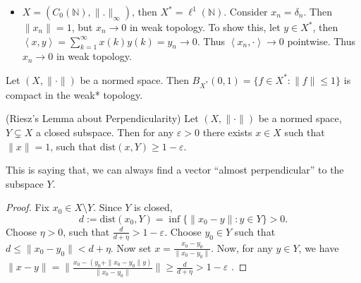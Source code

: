 \begin{example}
	\begin{itemize}
		\item $X = (C_0(\mathbb{N}), \|.\|_\infty )$, then $X^* = \ell^1(\mathbb{N})$. 
			Consider $x_n = \delta_n$. Then $\|x_n\| = 1$, but $x_n \to 0$ in weak topology. To show this, let $y \in X^*$, then $\left\langle x, y \right\rangle = \sum_{k = 1}^\infty x(k) y(k) = y_n \to 0$. Thus $\left\langle x_n, \cdot  \right\rangle \to 0$ pointwise. Thus $x_n \to  0$ in weak topology.
	\end{itemize}
\end{example}

\begin{theorem}
	\label{thm:BanachAlaogluThm}
	Let $(X, \|\cdot \|)$ be a normed space. Then $B_{X^*}(0,1) = \{f \in X^*: \|f\|\le 1\} $ is compact in the weak* topology.
\end{theorem} 

\begin{lemma}(Riesz's Lemma about Perpendicularity)
	\label{lem:Riesz}
	Let $(X, \|\cdot \|)$ be a normed space, $Y \subsetneq X$ a closed subspace. Then for any $\varepsilon > 0$ there exists $x \in X$ such that $\|x\| = 1$, such that $\text{dist}(x, Y) \ge  1 - \varepsilon$.
\end{lemma}
This is saying that, we can always find a vector ``almost perpendicular'' to the subspace $Y$.

\begin{proof}
	Fix $x_0 \in X\setminus Y$. Since $Y$ is closed, 
	\[
		d := \text{dist}(x_0, Y) = \inf \{\|x_0 - y\|: y \in Y\} > 0
	.\] 
	Choose $\eta > 0$, such that $\frac{d}{d + \eta}> 1 - \varepsilon$. Choose $y_0 \in Y$ such that $d \le \|x_0 - y_0\| < d + \eta$. Now set $x = \frac{x_0 - y_0}{\|x_0 - y_0\|}$. Now, for any $y \in Y$, we have $\|x - y\| = \|\frac{x_0 - (y_0 + \|x_0 - y_0\|y)}{\|x_0 - y_0\|}\| \ge \frac{d}{d + \eta} > 1 - \varepsilon$ . 
\end{proof}

